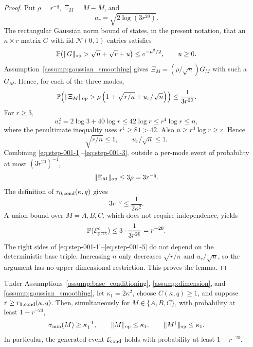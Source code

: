 \begin{proof}
Put \(\rho=r^{-q}\),
\(\Xi_M=M-\bar M\), and
\[
  u_r=\sqrt{2\log(3r^{20})}.
\]
The rectangular Gaussian norm bound of \citet[Theorem~II.13]{davidsonSzarek2001}
states, in the present notation, that an \(n\times r\) matrix \(G\) with
iid \(\mathcal N(0,1)\) entries satisfies
\[
  \mathbb P\!\left(\|G\|_{\rm op}>\sqrt n+\sqrt r+u\right)
  \le e^{-u^2/2},\qquad u\ge0.
\]
Assumption~\ref{assump:gaussian_smoothing} gives
\(\Xi_M=(\rho/\sqrt n)G_M\) with such a \(G_M\).  Hence, for each of the
three modes,
\begin{equation}
  \mathbb P\!\left(
    \|\Xi_M\|_{\rm op}
    >\rho\left(1+\sqrt{r/n}+u_r/\sqrt n\right)
  \right)
  \le \frac1{3r^{20}}.                                      \label{eq:step-001-1}
\end{equation}
For \(r\ge3\),
\begin{equation}
  u_r^2=2\log 3+40\log r
  \le42\log r
  \le r^4\log r
  \le n,                                                     \label{eq:step-001-2}
\end{equation}
where the penultimate inequality uses \(r^4\ge81>42\). Also
\(n\ge r^4\log r\ge r\). Hence
\begin{equation}
  \sqrt{r/n}\le1,
  \qquad u_r/\sqrt n\le1.                                   \label{eq:step-001-3}
\end{equation}
Combining \eqref{eq:step-001-1}--\eqref{eq:step-001-3}, outside a per-mode event of probability at most
\((3r^{20})^{-1}\),
\[
  \|\Xi_M\|_{\rm op}
  \le3\rho=3r^{-q}.
\]
The definition of \(r_{0,\rm cond}(\kappa,q)\) gives
\begin{equation}
  3r^{-q}\le\frac1{2\kappa^2}.                              \label{eq:step-001-4}
\end{equation}
A union bound over \(M=A,B,C\), which does not require independence, yields
\begin{equation}
  \mathbb P(\mathcal E_{\rm pert}^c)
  \le3\cdot\frac1{3r^{20}}=r^{-20}.                         \label{eq:step-001-5}
\end{equation}
The right sides of \eqref{eq:step-001-1}--\eqref{eq:step-001-5} do not depend on the deterministic base triple.
Increasing \(n\) only decreases \(\sqrt{r/n}\) and \(u_r/\sqrt n\), so the
argument has no upper-dimensional restriction. This proves the lemma.


\end{proof}


\begin{proposition}
\label{prop:step-001-realized-conditioning}
Under Assumptions~\ref{assump:base_conditioning},
\ref{assump:dimension}, and \ref{assump:gaussian_smoothing}, let
\(\kappa_1=2\kappa^2\), choose \(C(\kappa,q)\ge1\), and suppose
\(r\ge r_{0,\rm cond}(\kappa,q)\). Then, simultaneously for
\(M\in\{A,B,C\}\), with probability at least \(1-r^{-20}\),
\[
  \sigma_{\min}(M)\ge\kappa_1^{-1},
  \qquad
  \|M\|_{\rm op}\le\kappa_1,
  \qquad
  \|M^\dagger\|_{\rm op}\le\kappa_1.
\]
In particular, the generated event \(\mathcal E_{\rm cond}\) holds with
probability at least \(1-r^{-20}\).

\end{proposition}

